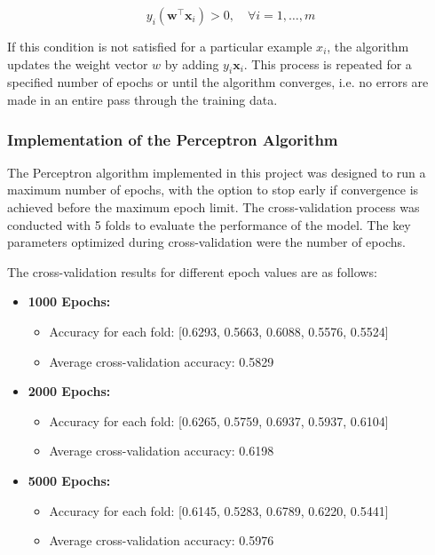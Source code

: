 \documentclass[a4paper, 10pt]{article}
\begin{document}
\[
y_i (\mathbf{w}^\top \mathbf{x}_i) > 0, \quad \forall i = 1, \dots, m
\]

If this condition is not satisfied for a particular example \({x}_i\), the algorithm updates the weight vector \({w}\) by adding \(y_i \mathbf{x}_i\). This process is repeated for a specified number of epochs or until the algorithm converges, i.e. no errors are made in an entire pass through the training data.

\subsubsection{Implementation of the Perceptron Algorithm}

The Perceptron algorithm implemented in this project was designed to run a maximum number of epochs, with the option to stop early if convergence is achieved before the maximum epoch limit. The cross-validation process was conducted with 5 folds to evaluate the performance of the model. The key parameters optimized during cross-validation were the number of epochs.
\par
The cross-validation results for different epoch values are as follows:

\begin{itemize}
    \item \textbf{1000 Epochs:}
    \begin{itemize}
        \item Accuracy for each fold: [0.6293, 0.5663, 0.6088, 0.5576, 0.5524]
        \item Average cross-validation accuracy: 0.5829
    \end{itemize}
    \item \textbf{2000 Epochs:}
    \begin{itemize}
        \item Accuracy for each fold: [0.6265, 0.5759, 0.6937, 0.5937, 0.6104]
        \item Average cross-validation accuracy: 0.6198
    \end{itemize}
    \item \textbf{5000 Epochs:}
    \begin{itemize}
        \item Accuracy for each fold: [0.6145, 0.5283, 0.6789, 0.6220, 0.5441]
        \item Average cross-validation accuracy: 0.5976
    \end{itemize}
\end{itemize}
\end{document}

